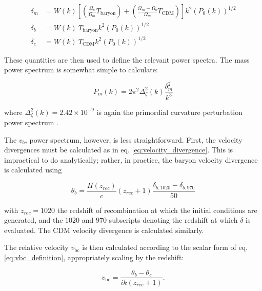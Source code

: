 \documentclass[floats,floatfix,showpacs,amssymb,prd,superscriptaddress,nofootinbib]{revtex4-2} %
\newcommand{\red}{\textcolor{red}}
\begin{document}
\begin{equation}
    \begin{split}
        \delta_m & = W(k) \left[ \left( \frac{\Omega_b}{\Omega_m} T_{\text{baryon}} \right) + \left( \frac{\Omega_m - \Omega_b}{\Omega_m} T_{\text{CDM}} \right) \right] k^2 \left( P_0 (k) \right)^{1/2} \\
        \delta_b & = W(k) ~ T_{\text{baryon}} k^2 \left( P_0 (k) \right)^{1/2} \\
        \delta_c & = W(k) ~ T_{\text{CDM}} k^2 \left( P_0 (k) \right)^{1/2}
    \end{split}
\end{equation}

These quantities are then used to define the relevant power spectra. The mass power spectrum is somewhat simple to calculate: 

\begin{equation}
    P_m(k) = 2\pi^2\Delta_\zeta ^2 (k) \frac{\delta_m^2}{k^3}
\end{equation}

\noindent where $\Delta_\zeta ^2 (k) = 2.42 \times 10^{-9}$ is again the primordial curvature perturbation power spectrum \citep{Dunkley_2009}. 

The $v_{bc}$ power spectrum, however, is less straightforward. First, the velocity divergences must be calculated as in eq. \ref{eq:velocity_divergence}. This is impractical to do analytically; rather, in practice, the baryon velocity divergence is calculated using

\begin{equation}
    \theta_b = \frac{H(z_{rec})}{c} (z_{rec} + 1) \frac{\delta_{b, 1020} - \delta_{b, 970}}{50}
    \label{eq:velocity_divergence_practical_calculation}
\end{equation}

\noindent with $z_{rec} = 1020$ the redshift of recombination at which the initial conditions are generated, and the $1020$ and $970$ subscripts denoting the redshift at which $\delta$ is evaluated. The CDM velocity divergence is calculated similarly.

The relative velocity 
$v_\text{bc}$ is then calculated according to the scalar form of eq. \ref{eq:vbc_definition}, appropriately scaling by the redshift:

\begin{equation}
    v_\text{bc} = \frac{\theta_b - \theta_c}{i k (z_{rec} + 1)}.
\end{equation}
\end{document}
